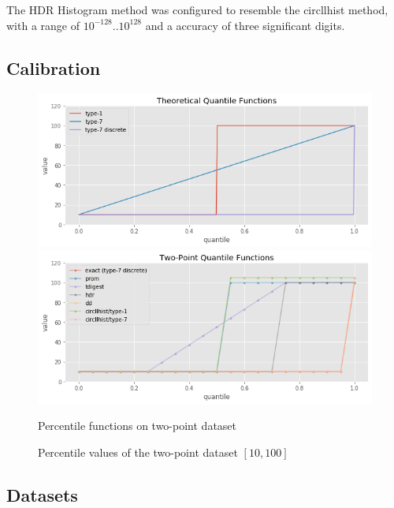 \documentclass{article}
\theoremstyle{plain}
\theoremstyle{remark}
\begin{document}
The HDR Histogram method was configured to resemble the circllhist method, with a range of
$10^{-128} .. 10^{128}$ and a accuracy of three significant digits.



\clearpage
\subsection{Calibration}

\begin{figure}
   \includegraphics[width=\textwidth]{evaluation/images/quantile_comparison.png}
   \includegraphics[width=\textwidth]{evaluation/images/Two_Points_quantile_comparison.png}
   \caption{Percentile functions on two-point dataset}
\end{figure}

\begin{figure}
  \centering
  
  \caption{Percentile values of the two-point dataset $[10,100]$}
\end{figure}

\clearpage
\subsection{Datasets}
\end{document}
